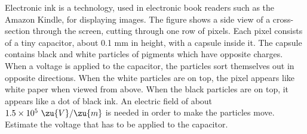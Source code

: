 Electronic ink is a technology, used in electronic book readers such
as the Amazon Kindle, for displaying images. The figure shows a side
view of a cross-section through the screen, cutting through one row of
pixels.  Each pixel consists of a tiny capacitor, about 0.1 mm in
height, with a capsule inside it. The capsule contains black and white
particles of pigments which have opposite charges. When a voltage is
applied to the capacitor, the particles sort themselves out in
opposite directions. When the white particles are on top, the pixel
appears like white paper when viewed from above. When the black
particles are on top, it appears like a dot of black ink. An electric
field of about $1.5\times10^5\ \zu{V}/\zu{m}$ is needed in order to
make the particles move. Estimate the voltage that has to be applied
to the capacitor.\answercheck
